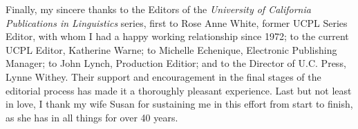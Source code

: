 \documentclass[12pt]{article}
\begin{document}
Finally, my sincere thanks to the Editors of the {\it University of California Publications in Linguistics} series, first to Rose Anne White, former UCPL Series Editor, with whom I had a happy working relationship since 1972; to the current UCPL Editor, Katherine Warne; to Michelle Echenique, Electronic Publishing Manager; to John Lynch, Production Editior; and to the Director of U.C. Press, Lynne Withey. Their support and encouragement in the final stages of the editorial process has made it a thoroughly pleasant experience. Last but not least in love, I thank my wife Susan for sustaining me in this effort from start to finish, as she has in all things for over 40 years.
\end{document}
